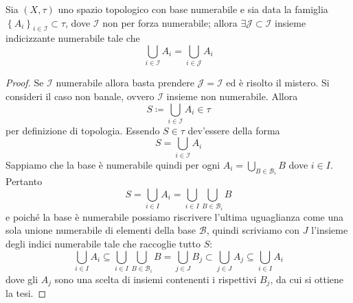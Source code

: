 \begin{theorem}
	Sia $(X,\tau)$ uno spazio topologico con base numerabile e sia data la famiglia $\left\{A_i\right\}_{i\in \mathcal{I}} \subset \tau$, dove $\mathcal{I}$ non per forza numerabile; allora $\exists \mathcal{J} \subset \mathcal{I}$ insieme indicizzante numerabile tale che 
	\begin{equation*}
		\bigcup_{i \in \mathcal{I}} A_i = \bigcup_{i \in \mathcal{J}} A_i
	\end{equation*}
\end{theorem}
\begin{proof}
	Se $\mathcal{I}$ numerabile allora basta prendere $\mathcal{J} = \mathcal{I}$ ed è risolto il mistero.	Si consideri il caso non banale, ovvero $\mathcal{I}$ insieme non numerabile. Allora 
	\begin{equation*}
		S \coloneqq \bigcup_{i \in \mathcal{I}} A_i \in \tau
	\end{equation*}
	per definizione di topologia. Essendo $S \in \tau$ dev'essere della forma
	\begin{equation*}
		S = \bigcup_{i \in \mathcal{I}} A_i 
	\end{equation*}
	Sappiamo che la base è numerabile quindi per ogni $A_i = \bigcup_{B \in \mathcal{B}_i} B$ dove $i \in I$. Pertanto 
	\begin{equation*}
		S = \bigcup_{i \in I} A_i = \bigcup_{i \in I} \bigcup_{B \in \mathcal{B}_i} B
	\end{equation*}
	e poiché la base è numerabile possiamo riscrivere l'ultima uguaglianza come una sola unione numerabile di elementi della base $\mathcal{B}$, quindi scriviamo con $J$ l'insieme degli indici numerabile tale che raccoglie tutto $S$:
	\begin{equation*}
			\bigcup_{i \in I} A_i \subseteq \bigcup_{i \in I} \bigcup_{B \in \mathcal{B}_i} B = \bigcup_{j \in J} B_j \subset \bigcup_{j \in J} A_j \subseteq \bigcup_{i \in I} A_i
	\end{equation*}
	dove gli $A_j$ sono una scelta di insiemi contenenti i rispettivi $B_j$, da cui si ottiene la tesi.
\end{proof}


\newpage
